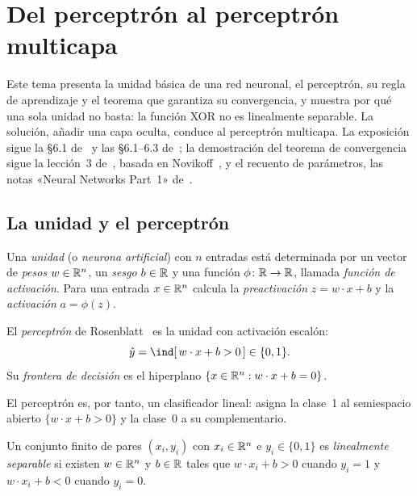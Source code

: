 \chapter{Del perceptrón al perceptrón multicapa}
\label{tema:1}

Este tema presenta la unidad básica de una red neuronal, el perceptrón, su regla de aprendizaje y el teorema que garantiza su convergencia, y muestra por qué una sola unidad no basta: la función XOR no es linealmente separable. La solución, añadir una capa oculta, conduce al perceptrón multicapa. La exposición sigue la §6.1 de~\cite{gbc} y las §6.1--6.3 de~\cite{jm3}; la demostración del teorema de convergencia sigue la lección~3 de~\cite{cs4780}, basada en Novikoff~\cite{novikoff}, y el recuento de parámetros, las notas «Neural Networks Part~1» de~\cite{cs231n}.

\section{La unidad y el perceptrón}

\begin{definicion}[Unidad]\label{def:unidad}
Una \emph{unidad} (o \emph{neurona artificial}) con $n$ entradas está determinada por un vector de \emph{pesos} $w\in\mathbb{R}^{n}$, un \emph{sesgo} $b\in\mathbb{R}$ y una función $\phi\colon\mathbb{R}\to\mathbb{R}$, llamada \emph{función de activación}. Para una entrada $x\in\mathbb{R}^{n}$ calcula la \emph{preactivación} $z=w\cdot x+b$ y la \emph{activación} $a=\phi(z)$.
\end{definicion}

\begin{definicion}[Perceptrón]\label{def:perceptron}
El \emph{perceptrón} de Rosenblatt~\cite{rosenblatt} es la unidad con activación escalón:
\[
\hat y=\ind[\,w\cdot x+b>0\,]\in\{0,1\}.
\]
Su \emph{frontera de decisión} es el hiperplano $\{x\in\mathbb{R}^{n}:w\cdot x+b=0\}$.
\end{definicion}

El perceptrón es, por tanto, un clasificador lineal: asigna la clase~1 al semiespacio abierto $\{w\cdot x+b>0\}$ y la clase~0 a su complementario.

\addtocounter{definicion}{1}%

\begin{definicion}
Un conjunto finito de pares $(x_i,y_i)$ con $x_i\in\mathbb{R}^{n}$ e $y_i\in\{0,1\}$ es \emph{linealmente separable} si existen $w\in\mathbb{R}^{n}$ y $b\in\mathbb{R}$ tales que $w\cdot x_i+b>0$ cuando $y_i=1$ y $w\cdot x_i+b<0$ cuando $y_i=0$.
\end{definicion}

